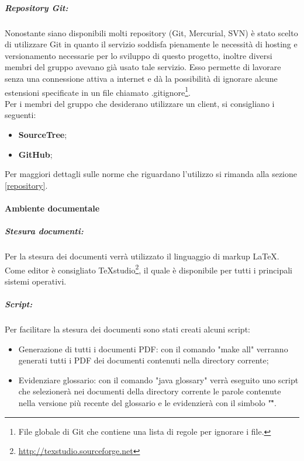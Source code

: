 \subparagraph{Repository Git:}

Nonostante siano disponibili molti \gls{repository} (\gls{Git}, \gls{Mercurial}, \gls{SVN}) è stato scelto di utilizzare \gls{Git} in quanto il servizio soddisfa pienamente le necessità di \gls{hosting} e \gls{versionamento} necessarie per lo sviluppo di questo progetto, inoltre diversi membri del gruppo avevano già usato tale servizio. Esso permette di lavorare senza una connessione attiva a internet e dà la possibilità di ignorare alcune estensioni specificate in un file chiamato .gitignore\footnote{File globale di \gls{Git} che contiene una lista di regole per ignorare i file.}.\\ Per i membri del gruppo che desiderano utilizzare un client, si consigliano i seguenti:
\begin{itemize}
	\item \textbf{SourceTree};
	\item \textbf{\gls{GitHub}};
\end{itemize}
Per maggiori dettagli sulle norme che riguardano l'utilizzo si rimanda alla sezione \ref{repository}.

\newpage
\paragraph{Ambiente documentale}

\subparagraph{Stesura documenti:}

Per la stesura dei documenti verrà utilizzato il \gls{linguaggio di markup} \LaTeX.
Come editor è consigliato TeXstudio\footnote{\url{http://texstudio.sourceforge.net}}, il quale è disponibile per tutti i principali sistemi operativi.

\subparagraph{Script:}

Per facilitare la stesura dei documenti sono stati creati alcuni script:

\begin{itemize}
	\item Generazione di tutti i documenti PDF: con il comando "make all" verranno generati tutti i PDF dei documenti contenuti nella directory corrente;
	\item Evidenziare glossario: con il comando "java glossary" verrà eseguito uno script che selezionerà nei documenti della directory corrente le parole contenute nella versione più recente del glossario e le evidenzierà con il simbolo "\G".

\end{itemize}

